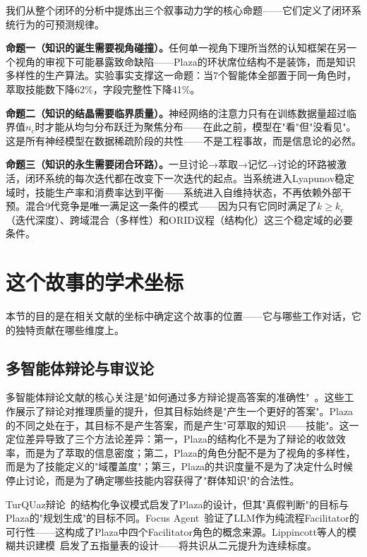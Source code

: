 \documentclass[twocolumn,10.5pt]{ctexart}
\begin{document}
我们从整个闭环的分析中提炼出三个叙事动力学的核心命题——它们定义了闭环系统行为的可预测规律。

\textbf{命题一（知识的诞生需要视角碰撞）。}任何单一视角下理所当然的认知框架在另一个视角的审视下可能暴露致命缺陷——Plaza的环状席位结构不是装饰，而是知识多样性的生产算法。实验事实支撑这一命题：当7个智能体全部置于同一角色时，萃取技能数下降62\%，字段完整性下降41\%。

\textbf{命题二（知识的结晶需要临界质量）。}神经网络的注意力只有在训练数据量超过临界值$n_c$时才能从均匀分布跃迁为聚焦分布——在此之前，模型在"看"但"没看见"。这是所有神经模型在数据稀疏阶段的共性——不是工程事故，而是信息论的必然。

\textbf{命题三（知识的永生需要闭合环路）。}一旦讨论→萃取→记忆→讨论的环路被激活，闭环系统的每次迭代都在改变下一次迭代的起点。当系统进入Lyapunov稳定域时，技能生产率和消费率达到平衡——系统进入自维持状态，不再依赖外部干预。混合9代竞争是唯一满足这一条件的模式——因为只有它同时满足了$k \geq k_c$（迭代深度）、跨域混合（多样性）和ORID议程（结构化）这三个稳定域的必要条件。

\section{这个故事的学术坐标}

本节的目的是在相关文献的坐标中确定这个故事的位置——它与哪些工作对话，它的独特贡献在哪些维度上。

\subsection{多智能体辩论与审议论}

多智能体辩论文献的核心关注是"如何通过多方辩论提高答案的准确性"~\cite{du2023improving,liang2023encouraging,zhang2024reconcile,xiong2023dubi}。这些工作展示了辩论对推理质量的提升，但其目标始终是"产生一个更好的答案"。Plaza的不同之处在于，其目标不是产生答案，而是产生"可萃取的知识——技能"。这一定位差异导致了三个方法论差异：第一，Plaza的结构化不是为了辩论的收敛效率，而是为了萃取的信息密度；第二，Plaza的角色分配不是为了视角的多样性，而是为了技能定义的"域覆盖度"；第三，Plaza的共识度量不是为了决定什么时候停止讨论，而是为了确定哪些技能内容获得了"群体知识"的合法性。

TurQUaz辩论~\cite{gungor2025turquaz}的结构化争议模式启发了Plaza的设计，但其"真假判断"的目标与Plaza的"规划生成"的目标不同。Focus Agent~\cite{khamsi2024focus}验证了LLM作为纯流程Facilitator的可行性——这构成了Plaza中四个Facilitator角色的概念来源。Lippincott等人的模糊共识建模~\cite{lippincott2025fuzzy}启发了五指量表的设计——将共识从二元提升为连续标度。
\end{document}
